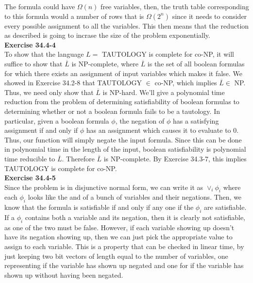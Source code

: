 \documentclass{article}
\begin{document}
The formula could have $\Omega(n)$ free variables, then, the truth table corresponding to this formula would a number of rows that is $\Omega(2^n)$ since it needs to consider every possible assignment to all the variables. This then means that the reduction as described is going to incrase the size of the problem exponentially.\\

\noindent\textbf{Exercise 34.4-4}\\

To show that the language $L=$ TAUTOLOGY is complete for co-NP, it will suffice to show that $\overline{L}$ is NP-complete, where $\overline{L}$ is the set of all boolean formulas for which there exists an assignment of input variables which makes it false.  We showed in Exercise 34.2-8 that TAUTOLOGY $\in$ co-NP, which implies $\overline{L} \in$ NP.  Thus, we need only show that $\overline L$ is NP-hard.  We'll give a polynomial time reduction from the problem of determining satisfiability of boolean formulas to determining whether or not a boolean formula fails to be a tautology.  In particular, given a boolean formula $\phi$, the negation of $\phi$ has a satisfying assignment if and only if $\phi$ has an assignment which causes it to evaluate to 0.  Thus, our function will simply negate the input formula.  Since this can be done in polynomial time in the length of the input, boolean satisfiability is polynomial time reducible to $\overline{L}$.  Therefore $\overline{L}$ is NP-complete.  By Exercise 34.3-7, this implies TAUTOLOGY is complete for co-NP. \\

\noindent\textbf{Exercise 34.4-5}\\

Since the problem is in disjunctive normal form, we can write it as $\vee_i \phi_i$ where each $\phi_i$ looks like the and of a bunch of variables and their negations. Then, we know that the formula is satisfiable if and only if any one if the $\phi_i$ are satisfiable. If a $\phi_i$ contains both a variable and its negation, then it is clearly not satisfiable, as one of the two must be false. However, if each variable showing up doesn't have its negation showing up, then we can just pick the appropriate value to assign to each variable. This is a property that can be checked in linear time, by just keeping two bit vectors of length equal to the number of variables, one representing if the variable has shown up negated and one for if the variable has shown up without having been negated.\\
\end{document}
